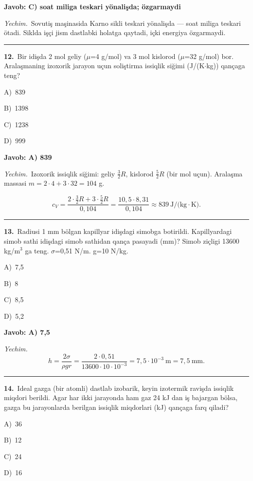 \documentclass[11pt,a4paper]{article}
\newcommand{\opt}[2]{\hspace*{4mm}#1)\ #2\par}
\begin{document}
\noindent\colorbox{gray!12}{\parbox{\dimexpr\linewidth-2\fboxsep}{\textbf{Javob: C) soat miliga teskari yönalişda; özgarmaydi}}}\par\smallskip
\noindent\textit{Yechim.}\ Sovutiş maşinasida Karno sikli teskari yönalişda — soat miliga teskari ötadi. Siklda işçi jism dastlabki holatga qaytadi, içki energiya özgarmaydi.\par\par\medskip\hrule\medskip
{}\noindent\begin{minipage}{\linewidth}
\textbf{12.}\ Bir idişda 2 mol geliy ($\mu$=4 g/mol) va 3 mol kislorod ($\mu$=32 g/mol) bor. Aralaşmaning izoxorik jarayon uçun soliştirma issiqlik siğimi (J/(K$\cdot$kg)) qançaga teng?\par\smallskip
\opt{A}{839}
\opt{B}{1398}
\opt{C}{1238}
\opt{D}{999}
\end{minipage}\vspace{2pt}\par
\noindent\colorbox{gray!12}{\parbox{\dimexpr\linewidth-2\fboxsep}{\textbf{Javob: A) 839}}}\par\smallskip
\noindent\textit{Yechim.}\ Izoxorik issiqlik siğimi: geliy $\frac32R$, kislorod $\frac52R$ (bir mol uçun). Aralaşma massasi $m=2\cdot4+3\cdot32=104$ g.\par
\[c_V=\frac{2\cdot\frac32R+3\cdot\frac52R}{0{,}104}=\frac{10{,}5\cdot8{,}31}{0{,}104}\approx839\ \text{J/(kg}\cdot\text{K)}.\]\par\medskip\hrule\medskip
{}\noindent\begin{minipage}{\linewidth}
\textbf{13.}\ Radiusi 1 mm bölgan kapillyar idişdagi simobga botirildi. Kapillyardagi simob sathi idişdagi simob sathidan qança pasayadi (mm)? Simob ziçligi 13600 kg/m$^{3}$ ga teng. $\sigma$=0,51 N/m. g=10 N/kg.\par\smallskip
\opt{A}{7,5}
\opt{B}{8}
\opt{C}{8,5}
\opt{D}{5,2}
\end{minipage}\vspace{2pt}\par
\noindent\colorbox{gray!12}{\parbox{\dimexpr\linewidth-2\fboxsep}{\textbf{Javob: A) 7,5}}}\par\smallskip
\noindent\textit{Yechim.}\ \[h=\frac{2\sigma}{\rho gr}=\frac{2\cdot0{,}51}{13600\cdot10\cdot10^{-3}}=7{,}5\cdot10^{-3}\ \text{m}=7{,}5\ \text{mm}.\]\par\medskip\hrule\medskip
{}\noindent\begin{minipage}{\linewidth}
\textbf{14.}\ Ideal gazga (bir atomli) dastlab izobarik, keyin izotermik ravişda issiqlik miqdori berildi. Agar har ikki jarayonda ham gaz 24 kJ dan iş bajargan bölsa, gazga bu jarayonlarda berilgan issiqlik miqdorlari (kJ) qançaga farq qiladi?\par\smallskip
\opt{A}{36}
\opt{B}{12}
\opt{C}{24}
\opt{D}{16}
\end{minipage}\vspace{2pt}\par
\end{document}

